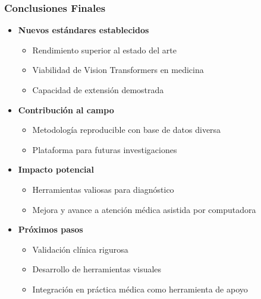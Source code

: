 \begin{frame}
\frametitle{Conclusiones Finales}
\begin{itemize}
    \item \textbf{Nuevos estándares establecidos}
    \begin{itemize}
        \item Rendimiento superior al estado del arte
        \item Viabilidad de Vision Transformers en medicina
        \item Capacidad de extensión demostrada
    \end{itemize}
    \item \textbf{Contribución al campo}
    \begin{itemize}
        \item Metodología reproducible con base de datos diversa
        \item Plataforma para futuras investigaciones
    \end{itemize}
    \item \textbf{Impacto potencial}
    \begin{itemize}
        \item Herramientas valiosas para diagnóstico
        \item Mejora y avance a atención médica asistida por computadora
    \end{itemize}
    \item \textbf{Próximos pasos}
    \begin{itemize}
        \item Validación clínica rigurosa
        \item Desarrollo de herramientas visuales
        \item Integración en práctica médica como herramienta de apoyo
    \end{itemize}
\end{itemize}
\end{frame}
